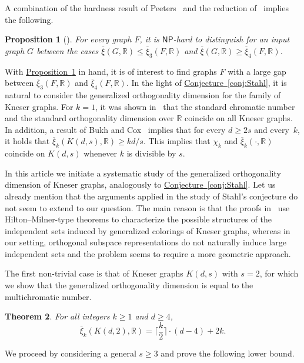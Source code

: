 \documentclass[11pt]{article}
\numberwithin{equation}{section}
\newtheorem{theorem}{Theorem}[section]
\newtheorem{proposition}[theorem]{Proposition}
\theoremstyle{definition}
\theoremstyle{plain}
\newcommand{\R}{\mathbb R}
\newcommand{\expref}[2]{\hyperref[#2]{#1~\ref{#2}}}
\newcommand{\NP}{\mathsf{NP}}
\newcommand{\od}{\overline{\xi}}
\begin{document}
A combination of the hardness result of Peeters~\cite{Peeters96} and the reduction of~\cite{GareyJ76a} implies the following.

\begin{proposition}[{\cite[Theorem~1.3]{HavivMFCS19}}]\label{prop:xi3vs4}
For every graph $F$, it is $\NP$-hard to 
%
%
distinguish for an input graph $G$ between the cases $\od(G,\R) \leq \od_3(F,\R)$ and $\od(G,\R) \geq \od_4(F,\R)$.
\end{proposition}
\noindent
With \expref{Proposition}{prop:xi3vs4} in hand, it is of interest to find graphs $F$ with a large gap between $\od_3(F,\R)$ and $\od_4(F,\R)$.
In
the %
light of \expref{Conjecture}{conj:Stahl}, it is natural to consider the generalized orthogonality dimension
%
%
for the family of Kneser graphs.
For $k=1$, it was shown in~\cite{Haviv18topo} that the standard chromatic number and the standard orthogonality dimension over $\R$ coincide on all Kneser graphs. In addition, a result of Bukh and Cox~\cite[Proposition~23]{BukhC18} implies that for every $d \geq 2s$ and every~$k$, it holds that $\od_k(K(d,s),\R) \geq kd/s$. This implies that
%
$\chi_k$ and $\od_k(\cdot,\R)$
%
%
%
%
coincide on $K(d,s)$ whenever $k$ is divisible by $s$.

In this %
article  %
we initiate a systematic study of the generalized orthogonality dimension
%
%
of Kneser graphs, analogously to \expref{Conjecture}{conj:Stahl}.
Let us already mention that the arguments applied in the study of Stahl's conjecture do not seem to extend to our question.
The main reason is that the proofs in~\cite{Stahl76,GareyJ76a,CGJ78,Stahl98} use Hilton--Milner-type theorems to characterize the possible structures of the independent sets induced by generalized colorings of Kneser graphs, whereas in our setting, orthogonal subspace representations do not naturally induce large independent sets and the problem seems to require a more geometric approach.

The first non-trivial case is that of Kneser graphs $K(d,s)$ with $s=2$, for which we show that the generalized orthogonality dimension
%
is equal to the multichromatic number.  %

\begin{theorem}\label{thm:Intro_s=2}
For all integers $k \geq 1$ and $d \geq 4$,
\[\od_{k}(K(d,2),\R) = \Big \lceil \frac{k}{2} \Big \rceil \cdot (d-4)+2k.\]
\end{theorem}

We proceed by considering a general $s \geq 3$ and prove the following lower bound.
\end{document}
